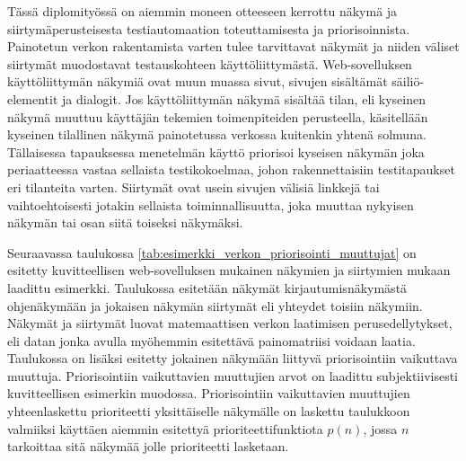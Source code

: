   Tässä diplomityössä on aiemmin moneen otteeseen kerrottu näkymä ja siirtymäperusteisesta testiautomaation toteuttamisesta ja priorisoinnista.
  Painotetun verkon rakentamista varten tulee tarvittavat näkymät ja niiden väliset siirtymät muodostavat testauskohteen käyttöliittymästä.
  Web-sovelluksen käyttöliittymän näkymiä ovat muun muassa sivut, sivujen sisältämät säiliö-elementit ja dialogit.
  Jos käyttöliittymän näkymä sisältää tilan, eli kyseinen näkymä muuttuu käyttäjän tekemien toimenpiteiden perusteella, käsitellään kyseinen tilallinen näkymä painotetussa verkossa kuitenkin yhtenä solmuna.
  Tällaisessa tapauksessa menetelmän käyttö priorisoi kyseisen näkymän joka periaatteessa vastaa sellaista testikokoelmaa, johon rakennettaisiin testitapaukset eri tilanteita varten.
  Siirtymät ovat usein sivujen välisiä linkkejä tai vaihtoehtoisesti jotakin sellaista toiminnallisuutta, joka muuttaa nykyisen näkymän tai osan siitä toiseksi näkymäksi.

  Seuraavassa taulukossa \ref{tab:esimerkki_verkon_priorisointi_muuttujat} on esitetty kuvitteellisen web-sovelluksen mukainen näkymien ja siirtymien mukaan laadittu esimerkki.
  Taulukossa esitetään näkymät kirjautumisnäkymästä ohjenäkymään ja jokaisen näkymän siirtymät eli yhteydet toisiin näkymiin.
  Näkymät ja siirtymät luovat matemaattisen verkon laatimisen perusedellytykset, eli datan jonka avulla myöhemmin esitettävä painomatriisi voidaan laatia.
  Taulukossa on lisäksi esitetty jokainen näkymään liittyvä priorisointiin vaikuttava muuttuja.
  Priorisointiin vaikuttavien muuttujien arvot on laadittu subjektiivisesti kuvitteellisen esimerkin muodossa.
  Priorisointiin vaikuttavien muuttujien yhteenlaskettu prioriteetti yksittäiselle näkymälle on laskettu taulukkoon valmiiksi käyttäen aiemmin esitettyä prioriteettifunktiota \(p(n)\), jossa \(n\) tarkoittaa sitä näkymää jolle prioriteetti lasketaan.

